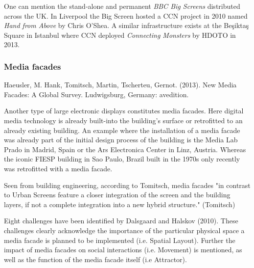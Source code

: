 
One can mention the stand-alone and permanent \textit{BBC Big Screens}  distributed across the UK. In Liverpool the Big Screen hosted a CCN project in 2010 named \textit{Hand from Above}  by Chris O’Shea.
A similar infrastructure exists at the Beşiktaş Square in Istanbul where CCN deployed \textit{Connecting Monsters}  by HDOTO in 2013. 


\subsubsection{Media facades}

Haeusler, M. Hank, Tomitsch, Martin,  Tscherteu, Gernot. (2013). New Media Facades: A Global
Survey. Ludwigsburg, Germany: avedition.

Another type of large electronic displays constitutes media facades. Here digital media technology is already built-into the building’s surface or retrofitted to an already existing building. An example where the installation of a media facade was already part of the initial design process of the building is the Media Lab Prado in Madrid, Spain or the Ars Electronica Center in Linz, Austria. Whereas the iconic FIESP building in Sao Paulo, Brazil built in the 1970s only recently was retrofitted with a media facade.

Seen from building engineering, according to Tomitsch, media facades "in contrast to Urban Screens feature a closer integration of the screen and the building layers, if not a complete integration into a new hybrid structure." (Tomitsch)

Eight challenges have been identified by Dalsgaard and Halskov (2010). 
These challenges clearly acknowledge the importance of the particular physical space a media facade is planned to be implemented (i.e. Spatial Layout). Further the impact of media facades on social interactions (i.e. Movement) is mentioned, as well as the function of the media facade itself (i.e Attractor).

